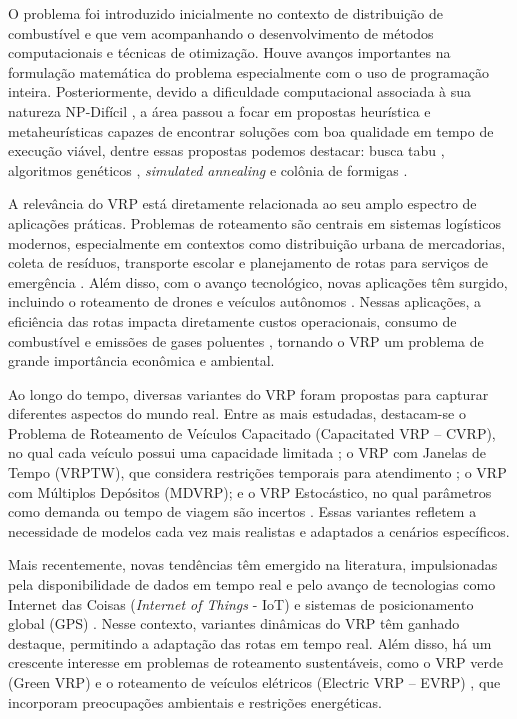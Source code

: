 O problema foi introduzido inicialmente no contexto de distribuição de combustível \cite{dantzig1959truck} e que vem acompanhando o desenvolvimento de métodos computacionais e técnicas de otimização. Houve avanços importantes na formulação matemática do problema especialmente com o uso de programação inteira. Posteriormente, devido a dificuldade computacional associada à sua natureza NP-Difícil \cite{hochba1997approximation}, a área passou a focar em propostas heurística e metaheurísticas capazes de encontrar soluções com boa qualidade em tempo de execução viável, dentre essas propostas podemos destacar: busca tabu \cite{glover1989tabu, glover1990tabu}, algoritmos genéticos \cite{boldberg1989genetic}, \textit{simulated annealing} \cite{kirkpatrick1983optimization} e colônia de formigas \cite{dorigo2002ant}. 

A relevância do VRP está diretamente relacionada ao seu amplo espectro de aplicações práticas. Problemas de roteamento são centrais em sistemas logísticos modernos, especialmente em contextos como distribuição urbana de mercadorias, coleta de resíduos, transporte escolar e planejamento de rotas para serviços de emergência \cite{golden2008vehicle,toth2002vehicle}. Além disso, com o avanço tecnológico, novas aplicações têm surgido, incluindo o roteamento de drones e veículos autônomos \cite{otto2018optimization}. Nessas aplicações, a eficiência das rotas impacta diretamente custos operacionais, consumo de combustível e emissões de gases poluentes \cite{lin2014survey}, tornando o VRP um problema de grande importância econômica e ambiental.

Ao longo do tempo, diversas variantes do VRP foram propostas para capturar diferentes aspectos do mundo real. Entre as mais estudadas, destacam-se o Problema de Roteamento de Veículos Capacitado (Capacitated VRP – CVRP), no qual cada veículo possui uma capacidade limitada  \cite{solomon1987algorithms}; o VRP com Janelas de Tempo (VRPTW), que considera restrições temporais para atendimento \cite{christofides1979vehicle}; o VRP com Múltiplos Depósitos (MDVRP); e o VRP Estocástico, no qual parâmetros como demanda ou tempo de viagem são incertos \cite{renaud1996tabu, gendreau1996stochastic}. Essas variantes refletem a necessidade de modelos cada vez mais realistas e adaptados a cenários específicos.

Mais recentemente, novas tendências têm emergido na literatura, impulsionadas pela disponibilidade de dados em tempo real e pelo avanço de tecnologias como Internet das Coisas (\textit{Internet of Things} - IoT) e sistemas de posicionamento global (GPS) \cite{ritzinger2016survey, boysen2018scheduling}. Nesse contexto, variantes dinâmicas do VRP têm ganhado destaque, permitindo a adaptação das rotas em tempo real. Além disso, há um crescente interesse em problemas de roteamento sustentáveis, como o VRP verde (Green VRP) \cite{lin2014survey} e o roteamento de veículos elétricos (Electric VRP – EVRP) \cite{schiffer2017electric}, que incorporam preocupações ambientais e restrições energéticas.

